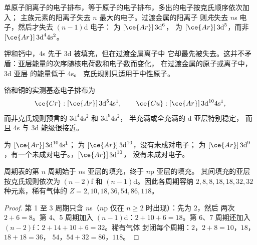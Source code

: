 \begin{proposition}[离子的电子排布]\label{prop:b1:quantum-numbers:ions}
单原子阴离子的电子排布，等于原子的电子排布，多出的电子按克氏顺序依次加入；
主族元素的阳离子失去
$n$ 最大的电子。过渡金属的阳离子
则\emph{先}失去 $n$s 电子，然后才失去
$(n-1)$d 电子： 为 $[\ce{Ar}]\,3\text{d}^6$，
 为 $[\ce{Ar}]\,3\text{d}^5$，而非 $[\ce{Ar}]\,3\text{d}^4
4\text{s}^2$。
\end{proposition}
\admitted

\begin{remark}[填充顺序不等于失去顺序]\label{rem:b1:quantum-numbers:order}
钾和钙中，4s 先于 3d 被填充，但在过渡金属离子中
它却最先被失去。这并不矛盾：亚层能量的次序随核电荷数和电子数而变化，
在过渡金属的原子或离子中，3d 亚层
的能量低于 4s。
克氏规则只适用于中性原子。
\end{remark}

\begin{proposition}[第一过渡系中的两个例外]\label{prop:b1:quantum-numbers:exceptions}
铬和铜的实测基态电子排布为
\[
  \ce{Cr}: [\ce{Ar}]\,3\text{d}^5 4\text{s}^1, \qquad
  \ce{Cu}: [\ce{Ar}]\,3\text{d}^{10} 4\text{s}^1 ,
\]
而非克氏规则预言的 $3\text{d}^4 4\text{s}^2$ 和 $3\text{d}^9 4\text{s}^2$，
半充满或全充满的 d 亚层特别稳定，
而且 4s 与 3d 能级很接近。
\end{proposition}

\begin{example}[铜及其离子]\label{ex:b1:quantum-numbers:copper}
 为 $[\ce{Ar}]\,3\text{d}^{10} 4\text{s}^1$； 为
$[\ce{Ar}]\,3\text{d}^{10}$，没有未成对电子； 为
$[\ce{Ar}]\,3\text{d}^9$，有一个未成对电子。，$[\ce{Ar}]\,3\text{d}^{10}$，
没有未成对电子。
\end{example}

\begin{proposition}[电子排布与周期表]\label{prop:b1:quantum-numbers:table}
周期表的第 $n$ 周期始于 $n$s 亚层的填充，终于 $n$p 亚层的填充。
其间填充的亚层按克氏规则依次为
$(n-2)$f 和 $(n-1)$d。因此各周期容纳
$2, 8, 8, 18, 18, 32, 32$ 种元素，稀有气体的 $Z = 2, 10,
18, 36, 54, 86, 118$。
\end{proposition}

\begin{proof}
第 1 至 3 周期只含 $n$s（$n$p 仅在 $n \ge 2$ 时出现）：先为 $2$，然后
两次 $2 + 6 = 8$。第 4、5 周期加入 $(n-1)$d：$2 + 10 + 6 =
18$。第 6、7 周期还加入 $(n-2)$f：$2 + 14 + 10 + 6 = 32$。稀有气体
封闭每个周期：$2$，$2 + 8 = 10$，$18$，$18 + 18 = 36$，
$54$，$54 + 32 = 86$，$118$。
\end{proof}

